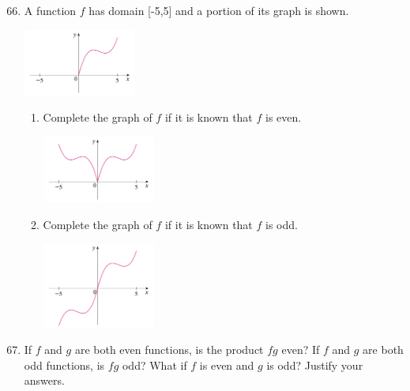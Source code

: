 \documentclass{article}
\begin{document}
\begin{enumerate}
\setcounter{enumi}{65}
  \item A function $f$ has domain [-5,5] and a portion of its graph is shown. \newline\begin{center}\includegraphics[width=140px]{images/hw1pr66}\end{center}
 \begin{enumerate}
 	\item Complete the graph of $f$ if it is known that $f$ is even.
		\newline \begin{center}\includegraphics[width=140px]{images/hw1pr66a}\end{center}
 	\item Complete the graph of $f$ if it is known that $f$ is odd.
 		\newline\begin{center}\includegraphics[width=140px]{images/hw1pr66b}\end{center}
 \end{enumerate}
\setcounter{enumi}{73}
 \item If $f$ and $g$ are both even functions, is the product $fg$ even? If $f$ and $g$ are both odd functions, is $fg$ odd? What if $f$ is even and $g$ is odd? Justify your answers.


\end{enumerate}
\end{document}
